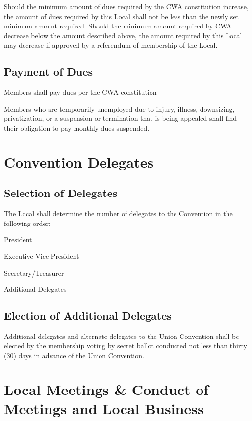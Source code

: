 \documentclass[12pt]{article}
\begin{document}
Should the minimum amount of dues required by the CWA constitution increase, the amount of dues required by this Local shall not be less than the newly set minimum amount required. Should the minimum amount required by CWA decrease below the amount described above, the amount required by this Local may decrease if approved by a referendum of membership of the Local.

\subsection{Payment of Dues}
\begin{letterlist}
\item Members shall pay dues per the CWA constitution
\item Members who are temporarily unemployed due to injury, illness, downsizing, privatization, or a suspension or termination that is being appealed shall find their obligation to pay monthly dues suspended.
\end{letterlist}

\section{Convention Delegates}
\subsection{Selection of Delegates}
The Local shall determine the number of delegates to the Convention in the following order:

\begin{numberlist}
\item President
\item Executive Vice President
\item Secretary/Treasurer
\item Additional Delegates
\end{numberlist}

\subsection{Election of Additional Delegates}
Additional delegates and alternate delegates to the Union Convention shall be elected by the membership voting by secret ballot conducted not less than thirty (30) days in advance of the Union Convention.

\section{Local Meetings \& Conduct of Meetings and Local Business}
\end{document}

